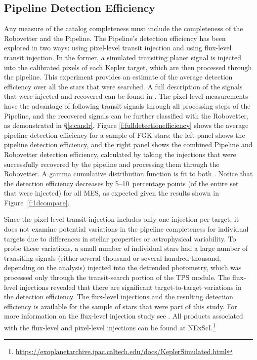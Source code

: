 \subsection{Pipeline Detection Efficiency}

Any measure of the catalog completeness must include the completeness of the Robovetter and the \Kepler{} Pipeline. The Pipeline's detection efficiency has been explored in two ways: using pixel-level transit injection and using flux-level transit injection. In the former, a simulated transiting planet signal is injected into the calibrated pixels of each Kepler target, which are then processed through the pipeline. This experiment provides an estimate of the average detection efficiency over all the stars that were searched. A full description of the signals that were injected and recovered can be found in \citet{Christiansen2017}. The pixel-level measurements have the advantage of following transit signals through all processing steps of the \Kepler{} Pipeline, and the recovered signals can be further classified with the Robovetter, as demonstrated in \S\ref{s:candr}. Figure \ref{f:fulldetectionefficiency} shows the average pipeline detection efficiency for a sample of FGK stars: the left panel shows the pipeline detection efficiency, and the right panel shows the combined Pipeline and Robovetter detection efficiency, calculated by taking the injections that were successfully recovered by the pipeline and processing them through the Robovetter. 
{\color{blue}A gamma cumulative distribution function is fit to both \citep[see equation 1 of ][]{Christiansen2016}.  Notice that the detection efficiency decreases by 5--10~percentage points (of the entire set that were injected) for all MES, as expected given the results shown in Figure~\ref{f:1dcompare}. }



Since the pixel-level transit injection includes only one injection per target, it does not examine potential variations in the pipeline completeness for individual targets due to differences in stellar properties or astrophysical variability. To probe these variations, a small number of individual stars had a large number of transiting signals (either several thousand or several hundred thousand, depending on the analysis) injected into the detrended photometry, which was processed only through the transit-search portion of the TPS module. The flux-level injections revealed that there are significant target-to-target variations in the detection efficiency. The flux-level injections and the resulting detection efficiency is available for the sample of stars that were part of this study. For more information on the flux-level injection study see \citet{Burke2017c}. All products associated with the flux-level and pixel-level injections can be found at NExScI.\footnote{\url{https://exoplanetarchive.ipac.caltech.edu/docs/KeplerSimulated.html}}


